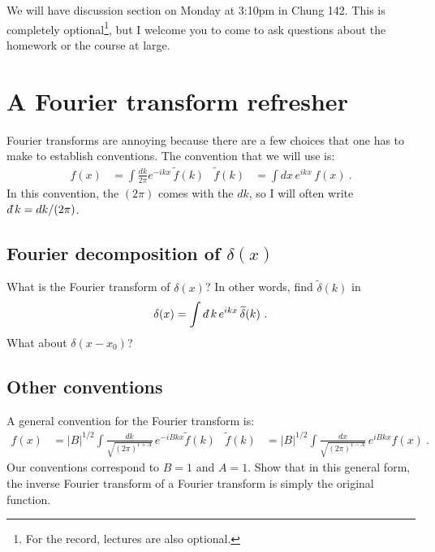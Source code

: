 \documentclass[12pt]{article}
\numberwithin{equation}{section}    %
\renewcommand{\tilde}{\widetilde}   %
\newcommand{\dbar}{d\mkern-6mu\mathchar'26}    %
\begin{document}
We will have discussion section on Monday at 3:10pm in Chung 142. This is completely optional\footnote{For the record, lectures are also optional.}, but I welcome you to come to ask questions about the homework or the course at large. 




\section{A Fourier transform refresher}

Fourier transforms are annoying because there are a few choices that one has to make to establish conventions. The convention that we will use is: %
\begin{align}
	f(x) &= \int \frac{dk}{2\pi} e^{-ikx}\, \tilde f(k)
	&
	\tilde f(k) &= \int dx \, e^{ikx}\, f(x) \ .
\end{align}
In this convention, the $(2\pi)$ comes with the $dk$, so I will often write $\dbar k = dk/(2\pi)$.

\subsection{Fourier decomposition of $\delta(x)$}

What is the Fourier transform of $\delta(x)$? In other words, find $\tilde \delta(k)$ in
\begin{align}
	\delta(x) = \int \dbar k \, e^{ikx}\, \tilde\delta(k) \ .
\end{align}
What about $\delta(x-x_0)$?

\subsection{Other conventions}

A general convention for the Fourier transform is:
\begin{align}
	f(x) &= |B|^{1/2}
	\int \frac{dk}{\sqrt{(2\pi)^{1+A}}} \, e^{-iBkx} \tilde f(k)
	&
	\tilde f(k) &= |B|^{1/2}
	\int \frac{dx}{\sqrt{(2\pi)^{1-A}}} \, e^{iBkx} f(x) \ .
\end{align}
Our conventions correspond to $B=1$ and $A=1$. Show that in this general form, the inverse Fourier transform of a Fourier transform is simply the original function. 
\end{document}
